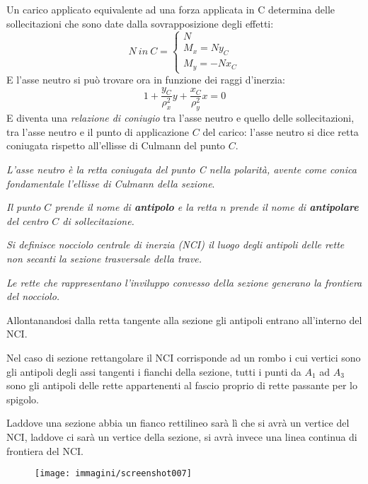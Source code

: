 \documentclass{article}
\begin{document}
\begin{adjustwidth}{2in}{}
		Un carico applicato equivalente ad una forza applicata in C
		determina delle sollecitazioni che sono date dalla
		sovrapposizione degli effetti:
		\[
		N ~ in ~ C = \begin{cases}
			N \\
			M_x = Ny_C \\
			M_y = -Nx_C
		\end{cases}
		\] 
		E l'asse neutro si può trovare ora in funzione dei raggi d'inerzia: 
		\[ 1+ \dfrac{y_C}{\rho^2_x}y + \dfrac{x_C}{\rho^2_y}x = 0\]
		E diventa una \textit{relazione di coniugio} tra l'asse neutro e quello delle sollecitazioni, tra l'asse neutro e il punto di applicazione $C$ del carico: l'asse neutro si dice retta coniugata rispetto all'ellisse di Culmann del punto $ C $. \newline 
		
		\textit{L'asse neutro è la retta coniugata del punto C nella polarità, avente come conica fondamentale l'ellisse di Culmann della sezione}. \newline 
		
		\textit{Il punto $C$ prende il nome di \textbf{antipolo} e la retta $n$ prende il nome di \textbf{antipolare} del centro $C$ di sollecitazione.} \newline
		
		\textit{Si definisce nocciolo centrale di inerzia (NCI) il luogo degli antipoli delle rette non secanti la sezione
		trasversale della trave.} \newline
		
		\textit{Le rette che rappresentano l'inviluppo convesso della sezione generano la frontiera del nocciolo.}\newline
		
		Allontanandosi dalla retta tangente alla sezione gli antipoli entrano all'interno del NCI. \newline 
		
		Nel caso di sezione rettangolare il NCI corrisponde ad un rombo i cui vertici sono gli antipoli degli assi tangenti i fianchi della sezione, tutti i punti da $A_1$ ad $A_3$ sono gli antipoli delle rette appartenenti al fascio proprio di rette passante per lo spigolo.
		
		Laddove una sezione abbia un fianco rettilineo sarà lì che si avrà un vertice del NCI, laddove ci sarà un vertice della sezione, si avrà invece una linea continua di frontiera del NCI.
		
\begin{figure}[H]
	\centering
	\texttt{[image: immagini/screenshot007]}
	\label{fig:screenshot007}
\end{figure}


\end{adjustwidth}
\end{document}
